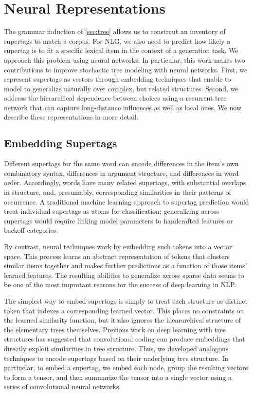 \documentclass[11pt]{article}
\begin{document}
\section{Neural Representations}
\label{sec:neural}

The grammar induction of \ref{sec:tree} allows us to constrcut an
inventory of supertags to match a corpus.  For NLG, we also need to
predict how likely a supertag is to fit a specific lexical item in the
context of a generation task.  We approach this problem using neural
networks. 
%
In particular, this work makes two contributions to improve stochastic
tree modeling with neural networks.
%
First, we represent supertags as vectors through embedding techniques
that enable to model to generalize naturally over complex, but related
structures.
%
Second, we address the hierarchical dependence between choices using a
recurrent tree network that can capture long-distance influences as
well as local ones.
%
We now describe these representations in more detail.

\subsection{Embedding Supertags}

Different supertags for the same word can encode differences in the
item's own combinatory syntax, differences in argument structure, and
differences in word order.  Accordingly, words have many related
supertags, with substantial overlaps in structure, and, presumably,
corresponding similarities in their patterns of occurrence.  A
traditional machine learning approach to supertag prediction would
treat individual supertags as atoms for classification; generalizing
across supertags would require linking model parameters to handcrafted
features or backoff categories.

By contrast, neural techniques work by embedding such tokens into a
vector space. This process learns an abstract representation of tokens
that clusters similar items together and makes further predictions
as a function of those items' learned features.  The resulting
abilities to generalize across sparse data seems to be one of the most
improtant reasons for the success of deep learning in NLP.

The simplest way to embed supertags is simply to treat each structure
as distinct token that indexes a corresponding learned vector.  This
places no constraints on the learned similarity function, but it also
ignores the hieararchical structure of the elementary trees
themselves.  Previous work on deep learning with tree structures has
suggested that convolutional coding can produce embeddings that
directly exploit similarities in tree structure.  Thus, we developed
analogous techniques to encode supertags based on their underlying
tree structure.  In partiuclar, to embed a supertag, we embed each
node, group the resulting vectors to form a tensor, and then summarize
the tensor into a single vector using a series of convolutional neural
networks.
\end{document}
